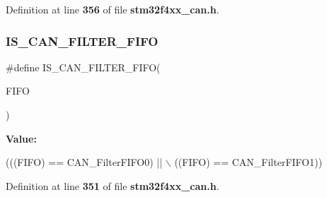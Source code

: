 Definition at line \textbf{ 356} of file \textbf{ stm32f4xx\+\_\+can.\+h}.

\mbox{\label{group__CAN__filter__FIFO_ga2df5ae0de841fc80c969e9147991ec9d}} 
\subsubsection{I\+S\+\_\+\+C\+A\+N\+\_\+\+F\+I\+L\+T\+E\+R\+\_\+\+F\+I\+FO}
{\footnotesize\ttfamily \#define I\+S\+\_\+\+C\+A\+N\+\_\+\+F\+I\+L\+T\+E\+R\+\_\+\+F\+I\+FO(\begin{DoxyParamCaption}\item[{}]{F\+I\+FO }\end{DoxyParamCaption})}

{\bfseries Value\+:}
\begin{DoxyCode}
(((FIFO) == CAN_FilterFIFO0) || \(\backslash\)
                                  ((FIFO) == CAN_FilterFIFO1))
\end{DoxyCode}


Definition at line \textbf{ 351} of file \textbf{ stm32f4xx\+\_\+can.\+h}.

